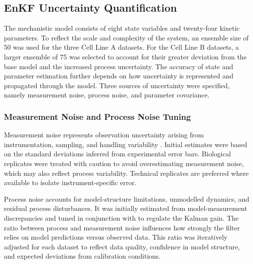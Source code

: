 \subsection{EnKF Uncertainty Quantification}
The mechanistic model consists of eight state variables and twenty-four kinetic parameters. To reflect the scale and complexity of the system, an ensemble size of 50 was used for the three Cell Line A datasets. For the Cell Line B datasets, a larger ensemble of 75 was selected to account for their greater deviation from the base model and the increased process uncertainty.  The accuracy of state and parameter estimation further depends on how uncertainty is represented and propagated through the model. Three sources of uncertainty were specified, namely measurement noise, process noise, and parameter covariance.

\subsubsection{Measurement Noise and Process Noise Tuning}

Measurement noise  represents observation uncertainty arising from instrumentation, sampling, and handling variability \cite{Evensen2003TheImplementation, Evensen2009TheSystems}. Initial estimates were based on the standard deviations inferred from experimental error bars. Biological replicates were treated with caution to avoid overestimating measurement noise, which may also reflect process variability. Technical replicates are preferred where available to isolate instrument-specific error.

Process noise  accounts for model-structure limitations, unmodelled dynamics, and residual process disturbances. It was initially estimated from model-measurement discrepancies and tuned in conjunction with  to regulate the Kalman gain. The ratio between process and measurement noise influences how strongly the filter relies on model predictions versus observed data. This ratio was iteratively adjusted for each dataset to reflect data quality, confidence in model structure, and expected deviations from calibration conditions. 
 
